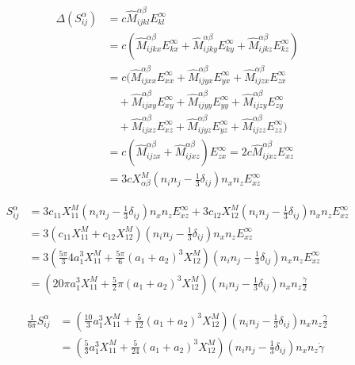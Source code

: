 \documentclass[12pt]{article}
\begin{document}
\begin{align*}
\Delta (S^{\alpha}_{ij})
&= 
c \hat{M}_{ijkl}^{\alpha\beta} E_{kl}^{\infty} \\
&=
c (
\hat{M}_{ijkx}^{\alpha\beta} E_{kx}^{\infty}
+
\hat{M}_{ijky}^{\alpha\beta} E_{ky}^{\infty}
+
\hat{M}_{ijkz}^{\alpha\beta} E_{kz}^{\infty}) \\
&=
c (
\hat{M}_{ijxx}^{\alpha\beta} E_{xx}^{\infty}
+
\hat{M}_{ijyx}^{\alpha\beta} E_{yx}^{\infty}
+
\hat{M}_{ijzx}^{\alpha\beta} E_{zx}^{\infty} \\
&\quad 
+
\hat{M}_{ijxy}^{\alpha\beta} E_{xy}^{\infty}
+
\hat{M}_{ijyy}^{\alpha\beta} E_{yy}^{\infty}
+
\hat{M}_{ijzy}^{\alpha\beta} E_{zy}^{\infty} \\
&\quad 
+
\hat{M}_{ijxz}^{\alpha\beta} E_{xz}^{\infty}
+
\hat{M}_{ijyz}^{\alpha\beta} E_{yz}^{\infty} 
+
\hat{M}_{ijzz}^{\alpha\beta} E_{zz}^{\infty}) \\
&=
c(
\hat{M}_{ijzx}^{\alpha\beta}
+
\hat{M}_{ijxz}^{\alpha\beta}
) E_{zx}^{\infty} 
=
2c\hat{M}_{ijxz}^{\alpha\beta}  E_{xz}^{\infty} \\
&=
3c X_{\alpha\beta}^{M}
(n_i n_j-\frac{1}{3}\delta_{ij}) 
n_x n_z E_{xz}^{\infty} 
\end{align*}


\begin{align}
S_{ij}^{\alpha} &= 
 3 c_{11} X_{11}^{M}
(n_i n_j-\frac{1}{3}\delta_{ij}) 
n_x n_z E_{xz}^{\infty} 
+
3 c_{12 }X_{12}^{M}
(n_i n_j-\frac{1}{3}\delta_{ij}) 
n_x n_z E_{xz}^{\infty}  \\
&= 3 (
c_{11} X_{11}^{M}
+ 
c_{12} X_{12}^{M})
(n_i n_j-\frac{1}{3}\delta_{ij})
n_x n_z E_{xz}^{\infty} 
 \\
&= 3 (
\frac{5\pi}{3} 4 a_1^3 X_{11}^{M}
+ 
\frac{5\pi}{6} (a_1 + a_2)^3 X_{12}^{M})
(n_i n_j-\frac{1}{3}\delta_{ij})
n_x n_z E_{xz}^{\infty} 
 \\
&=  (
20\pi  a_1^3  X_{11}^{M}
+ 
\frac{5}{2}\pi (a_1+a_2)^3 X_{12}^{M})
(n_i n_j-\frac{1}{3}\delta_{ij}) 
n_x n_z \frac{\dot{\gamma}}{2}
\end{align}

\begin{align}
\frac{1}{6\pi} S_{ij}^{\alpha} 
&= 
  (
\frac{10}{3}  a_1^3  X_{11}^{M}
+ 
\frac{5}{12} (a_1+a_2)^3 X_{12}^{M})
(n_i n_j-\frac{1}{3}\delta_{ij}) 
n_x n_z \frac{\dot{\gamma}}{2}
\\
&=
  (
\frac{5}{3}  a_1^3  X_{11}^{M}
+ 
\frac{5}{24} (a_1+a_2)^3 X_{12}^{M})
(n_i n_j-\frac{1}{3}\delta_{ij}) 
n_x n_z \dot{\gamma}
\\
\end{align}
\end{document}
